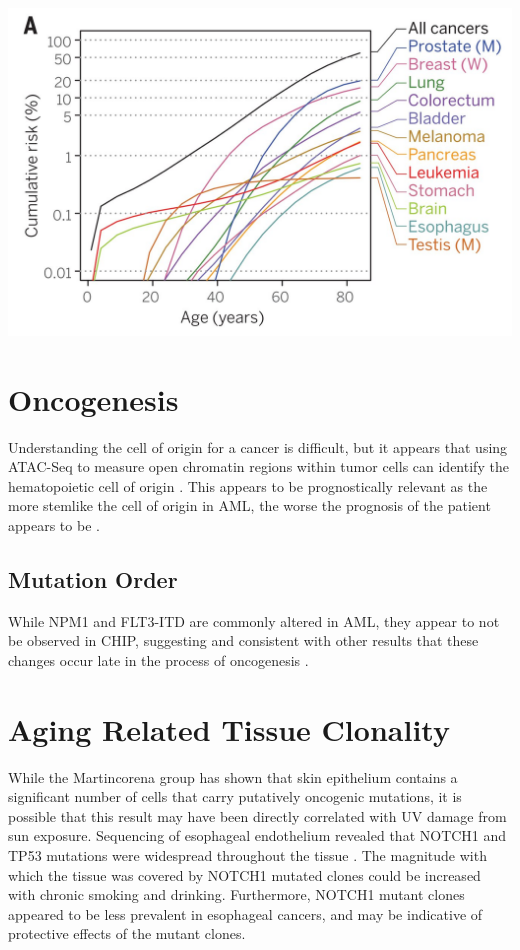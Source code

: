 \documentclass[]{book}
\begin{document}
\includegraphics{images/04-4.jpg}

\hypertarget{oncogenesis}{%
\section{Oncogenesis}\label{oncogenesis}}

Understanding the cell of origin for a cancer is difficult, but it appears that using ATAC-Seq to measure open chromatin regions within tumor cells can identify the hematopoietic cell of origin \citep{george2016leukaemia}. This appears to be prognostically relevant as the more stemlike the cell of origin in AML, the worse the prognosis of the patient appears to be \citep{young2016open}.

\hypertarget{mutation-order}{%
\subsection{Mutation Order}\label{mutation-order}}

While NPM1 and FLT3-ITD are commonly altered in AML, they appear to not be observed in CHIP, suggesting and consistent with other results that these changes occur late in the process of oncogenesis \citep{mckerrell2015leukemia, kronke2013clonal, abelson2018prediction}.

\hypertarget{aging-related-tissue-clonality}{%
\section{Aging Related Tissue Clonality}\label{aging-related-tissue-clonality}}

While the Martincorena group has shown that skin epithelium contains a significant number of cells that carry putatively oncogenic mutations, it is possible that this result may have been directly correlated with UV damage from sun exposure. Sequencing of esophageal endothelium revealed that NOTCH1 and TP53 mutations were widespread throughout the tissue \citep{yokoyama2019age, martincorena2018somatic}. The magnitude with which the tissue was covered by NOTCH1 mutated clones could be increased with chronic smoking and drinking. Furthermore, NOTCH1 mutant clones appeared to be less prevalent in esophageal cancers, and may be indicative of protective effects of the mutant clones.
\end{document}

